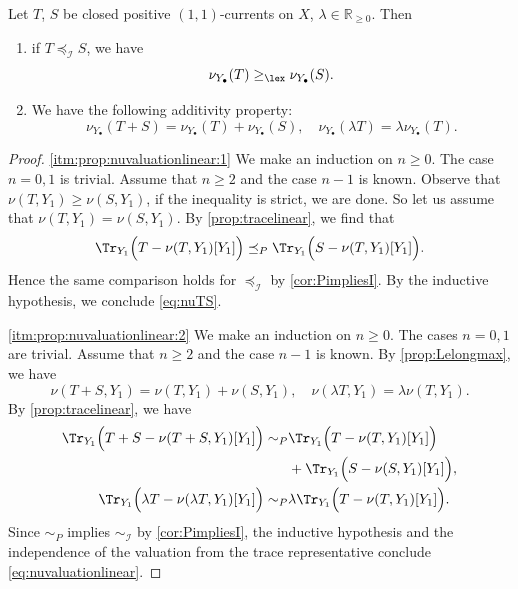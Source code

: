 \begin{proposition}\label{prop:nuvaluationlinear}
    Let $T$, $S$ be closed positive $(1,1)$-currents on $X$, $\lambda\in \mathbb{R}_{\geq 0}$. Then
    \begin{enumerate}
     \item\label{itm:prop:nuvaluationlinear:1} if $T\preceq_{\mathcal{I}} S$, we have
        \begin{equation}\label{eq:nuTS}
            \nu_{Y_{\bullet}}(T)\geq_{\lex}\nu_{Y_{\bullet}}(S).
        \end{equation}
        \item\label{itm:prop:nuvaluationlinear:2} We have the following additivity property:
        \begin{equation}\label{eq:nuvaluationlinear}
            \nu_{Y_{\bullet}}(T+S)=\nu_{Y_{\bullet}}(T)+\nu_{Y_{\bullet}}(S),\quad \nu_{Y_{\bullet}}(\lambda T)=\lambda \nu_{Y_{\bullet}}(T).
        \end{equation}
    \end{enumerate}
\end{proposition}
\begin{proof}
\ref{itm:prop:nuvaluationlinear:1} We make an induction on $n\geq 0$. The case $n=0,1$ is trivial. Assume that $n\geq 2$ and the case $n-1$ is known. Observe that $\nu(T,Y_1)\geq \nu(S,Y_1)$, if the inequality is strict, we are done. So let us assume that $\nu(T,Y_1)=\nu(S,Y_1)$. By \cref{prop:tracelinear}, we find that
    \[
    \Tr_{Y_1}\Bigl(T-\nu(T,Y_1)[Y_1]\Bigr)\preceq_P\Tr_{Y_1}\Bigl(S-\nu(T,Y_1)[Y_1]\Bigr).
    \]
    Hence the same comparison holds for $\preceq_{\mathcal{I}}$ by \cref{cor:PimpliesI}.
    By the inductive hypothesis, we conclude \eqref{eq:nuTS}.

\ref{itm:prop:nuvaluationlinear:2} We make an induction on $n\geq 0$. The cases $n=0,1$ are trivial. Assume that $n\geq 2$ and the case $n-1$ is known. By \cref{prop:Lelongmax}, we have
    \[
    \nu(T+S,Y_1)=\nu(T,Y_1)+\nu(S,Y_1),\quad \nu(\lambda T,Y_1)=\lambda\nu(T,Y_1).
    \]
    By \cref{prop:tracelinear}, we have
    \[
    \begin{split}
    \Tr_{Y_1}\Bigl(T+S-\nu(T+S,Y_1)[Y_1]\Bigr)\sim_P&\Tr_{Y_1}\Bigl(T-\nu(T,Y_1)[Y_1]\Bigr)\\
    &+\Tr_{Y_1}\Bigl(S-\nu(S,Y_1)[Y_1]\Bigr),\\
    \Tr_{Y_1}\Bigl(\lambda T-\nu(\lambda T,Y_1)[Y_1]\Bigr)\sim_P& \lambda \Tr_{Y_1}\Bigl(T-\nu(T,Y_1)[Y_1]\Bigr).
    \end{split}
    \]
    Since $\sim_P$ implies $\sim_{\mathcal{I}}$ by \cref{cor:PimpliesI}, the inductive hypothesis and the independence of the valuation from the trace representative conclude \eqref{eq:nuvaluationlinear}.

\end{proof}

